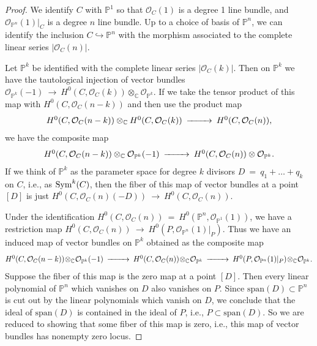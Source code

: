 \documentclass[twoside,12pt,reqno]{amsart}
\theoremstyle{plain}
\theoremstyle{definition}
\newcommand{\CC}{\mathbb{C}}
\newcommand{\PP}{\mathbb{P}}
\def\Sym{{\rm Sym}}
\def\ps{\vspace{4pt}}
\newcommand{\OO}{\mathcal O}
\begin{document}
\begin{proof}
We identify $C$ with $\PP^1$ so that $\OO_C(1)$ is a degree 1 line
bundle, and $\OO_{\PP^n}(1)|_C$ is a degree $n$ line bundle.  Up to a
choice of basis of $\PP^n$, we can identify the inclusion
$C\hookrightarrow \PP^n$ with the morphism associated to the complete
linear series $|\OO_C(n)|$.  

\ps

Let $\PP^k$ be identified with the complete linear series
$|\OO_C(k)|$.  Then on $\PP^k$ we have the tautological injection of
vector bundles $\OO_{\PP^k}(-1)~\rightarrow~ H^0(C,\OO_C(k))\otimes_\CC
\OO_{\PP^k}$.  If we take the tensor product of this map with
$H^0(C,\OO_C(n-k))$ and then use the product map
\begin{equation}
\begin{CD}
H^0(C,\OO_C(n-k))\otimes_\CC H^0(C,\OO_C(k)) @>>>
H^0(C,\OO_C(n)),
\end{CD}
\end{equation}
we have the composite map
\begin{equation}\begin{CD}
H^0(C,\OO_C(n-k))\otimes_\CC \OO_{\PP^k}(-1) @>>>
H^0(C,\OO_C(n))\otimes\OO_{\PP^k}.
\end{CD}\end{equation}
If we think of $\PP^k$ as the parameter space for degree $k$ divisors
$D~=~q_1+\dots + q_k$ on $C$, i.e., as $\Sym^k(C)$, then the fiber 
of this map of vector bundles at a point $[D]$ is just
$H^0(C,\OO_C(n)(-D))~\rightarrow~ H^0(C,\OO_C(n))$.  

\ps

Under the identification $H^0(C,\OO_C(n))~=~H^0(\PP^n,\OO_{\PP^1}(1))$,
we have a restriction map $H^0(C,\OO_C(n))~\rightarrow~
H^0(P,\OO_{\PP^n}(1)|_P)$.  Thus we have an induced map of vector bundles
on $\PP^k$ obtained as the composite map
\begin{equation}\begin{CD}
H^0(C,\OO_C(n-k))\!\otimes_\CC\! \OO_{\PP^k}(-1) @>>>
H^0(C,\OO_C(n))\!\otimes_\CC\! \OO_{\PP^k} @>>>
H^0(P,\OO_{\PP^n}(1)|_P)\!\otimes_\CC\! \OO_{\PP^k}.
\end{CD}\end{equation}
Suppose the fiber of this map is the zero map at a point $[D]$.  Then
every linear polynomial of $\PP^n$ which vanishes on $D$ also vanishes
on $P$.  Since $\text{span}(D)\subset \PP^n$ is cut out by the linear
polynomials which vanish on $D$, we conclude that the ideal of
$\text{span}(D)$ is contained in the ideal of $P$, i.e., $P\subset
\text{span}(D)$.  So we are reduced to showing that some fiber of this
map is zero, i.e., this map of vector bundles has nonempty zero locus.


\end{proof}
\end{document}
